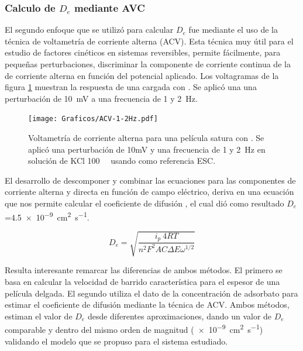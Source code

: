 	 \subsubsection*{Calculo de $D_e$ mediante AVC}

    	 El segundo enfoque que se utilizó para calcular $D_e$ fue mediante el uso de la técnica de voltametría de corriente alterna (ACV). Esta técnica muy útil para el estudio de factores cinéticos en sistemas reversibles, permite fácilmente, para pequeñas perturbaciones, discriminar la componente de corriente continua de la de corriente alterna en función del potencial aplicado. Los voltagramas de la figura \ref{fig:acv} muestran la respuesta de una \pdmF\space cargada con \ru. Se aplicó una una perturbación de \SI{10}{\milli\volt} a una frecuencia de 1 y \SI{2}{\hertz}.

	 			\begin{figure}[ht]
					\centering
			 	    \texttt{[image: Graficos/ACV-1-2Hz.pdf]}
			        \caption[Voltametrías de corriente alterna]{Voltametría de corriente alterna para una película satura con \ru. Se aplicó una perturbación de 10mV y una frecuencia de 1 y \SI{2}{\hertz} en solución de KCl \SI{100}{\milli\Molar} usando como referencia ESC.}
			        \label{fig:acv}
			      	\end{figure}

    	 El desarrollo de descomponer y combinar las ecuaciones para las componentes de corriente alterna y directa en función de campo eléctrico, deriva en una ecuación que nos permite calcular el coeficiente de difusión \cite{Wi2000}, el cual dió como resultado $D_e$=\SI{4.5e-9}{\square\cm\per\second}. 
    	 	
    	 		\begin{equation}
					D_e=\sqrt{\frac{i_p\ 4RT}{n^2 F^2 A C \Delta E \omega ^{1/2}}}
					\label{eq:acv}
				 \end{equation}

		
		 Resulta interesante remarcar las diferencias de ambos métodos. El primero se basa en calcular la velocidad de barrido característica para el espesor de una película delgada. El segundo utiliza el dato de la concentración de adsorbato para estimar el coeficiente de difusión mediante la técnica de ACV. Ambos métodos, estiman el valor de $D_e$ desde diferentes aproximaciones, dando un valor de $D_e$ comparable y dentro del mismo orden de magnitud (\SI{e-9}{\square\cm\per\second}) validando el modelo que se propuso para el sistema estudiado.
			
